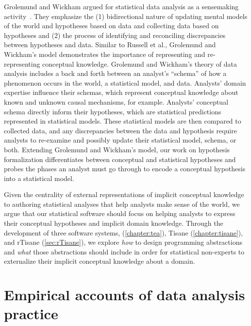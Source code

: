 Grolemund and Wickham argued for statistical data analysis as a sensemaking
activity~\cite{grolemund2014cognitive}. They emphasize the (1) bidirectional
nature of updating mental models of the world and hypotheses based on data and
collecting data based on hypotheses and (2) the process of identifying and
reconciling discrepancies between hypotheses and data. Similar to Russell et
al., Grolemund and Wickham's model demonstrates the importance of representing
and re-representing conceptual knowledge. Grolemund and Wickham's theory of data
analysis includes a back and forth between an analyst's ``schema'' of how a
phenomenon occurs in the world, a statistical model, and data. Analysts' domain
expertise influence their schemas, which represent conceptual knowledge about
known and unknown causal mechanisms, for example. Analysts' conceptual schema
directly inform their hypotheses, which are statistical predictions represented
in statistical models. These statistical models are then compared to collected
data, and any discrepancies between the data and hypothesis require analysts to
re-examine and possibly update their statistical model, schema, or both.
Extending Grolemund and Wickham's model, our work on hypothesis formalization
differentiates between conceptual and statistical hypotheses and probes the
phases an analyst must go through to encode a conceptual hypothesis into a
statistical model.

Given the centrality of external representations of implicit conceptual
knowledge to authoring statistical analyses that help analysts make sense of the
world, we argue that our statistical software should focus on helping analysts
to express their conceptual hypotheses and implicit domain knowledge. Through
the development of three software systems, \tea (\autoref{chapter:tea}),
Tisane (\autoref{chapter:tisane}), and rTisane (\autoref{sec:rTisane}), we
explore \textit{how} to design programming abstractions and \textit{what} those
abstractions should include in order for statistical non-experts to externalize
their implicit conceptual knowledge about a domain. 

\section{Empirical accounts of data analysis practice}


